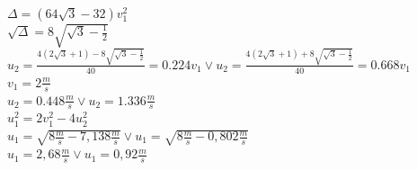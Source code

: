 \documentclass[14pt]{extarticle}
\begin{document}
        $\Delta = \left(64\sqrt{{3}}-32\right)v_1^2 $\\
        $\sqrt{{\Delta}} = 8\sqrt{{\sqrt{3}-\frac{1}{2}}} $\\
        $u_2 = \frac{4\left(2\sqrt{3}+1\right)-8\sqrt{{\sqrt{3}-\frac{1}{2}}}}{40}=0.224v_1 \lor
        u_2 = \frac{4\left(2\sqrt{3}+1\right)+8\sqrt{{\sqrt{3}-\frac{1}{2}}}}{40}=0.668v_1$ \\
        $v_1=2 \frac{m}{s}$\\
        $u_2 = 0.448\frac{m}{s} \lor u_2 = 1.336\frac{m}{s}$\\
        $u_1^2=2v_1^2-4u_2^2$\\
        $u_1=\sqrt{8\frac{m}{s}-7,138\frac{m}{s}} \lor u_1=\sqrt{8\frac{m}{s}-0,802\frac{m}{s}}$\\
        $u_1=2,68\frac{m}{s} \lor u_1=0,92\frac{m}{s}$\\
       
       
\end{document}
